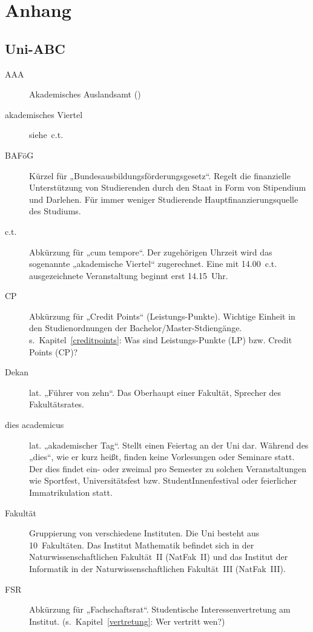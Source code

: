 
\section{Anhang}

\subsection{Uni-ABC}

\begin{description}
\item[AAA] Akademisches Auslandsamt ()
\item[akademisches Viertel] siehe~c.t.
\item[BAFöG] Kürzel für „Bundesausbildungsförderungsgesetz“.
             Regelt die finanzielle Unterstützung von Studierenden durch den Staat in Form von Stipendium und Darlehen.
             Für immer weniger Studierende Hauptfinanzierungsquelle des Studiums.
\item[c.t.] Abkürzung für „cum tempore“.
            Der zugehörigen Uhrzeit wird das sogenannte „akademische Viertel“ zugerechnet.
            Eine mit 14.00~c.t. ausgezeichnete Veranstaltung beginnt erst 14.15~Uhr.
\item[CP] Abkürzung für „Credit Points“ (Leistungs-Punkte). Wichtige Einheit in den Studienordnungen der Bachelor/Master-Stdiengänge.
          s.~Kapitel~\ref{creditpoints}: Was sind Leistungs-Punkte (LP) bzw. Credit Points (CP)?
\item[Dekan] lat. „Führer von zehn“. Das Oberhaupt einer Fakultät, Sprecher des Fakultätsrates.
\item[dies academicus] lat. „akademischer Tag“. Stellt einen Feiertag an der Uni dar.
                       Während des „dies“, wie er kurz heißt, finden keine Vorlesungen oder Seminare statt.
                       Der dies findet ein- oder zweimal pro Semester zu solchen Veranstaltungen wie Sportfest,
                       Universitätsfest bzw. StudentInnenfestival oder feierlicher Immatrikulation statt.
\item[Fakultät] Gruppierung von verschiedene Instituten. Die Uni besteht aus 10~Fakultäten.
                Das Institut Mathematik befindet sich in der Naturwissenschaftlichen Fakultät~II (NatFak~II)
                und das Institut der Informatik in der Naturwissenschaftlichen Fakultät~III (NatFak~III).
\item[FSR] Abkürzung für „Fachschaftsrat“. Studentische Interessenvertretung am Institut.
           (s.~Kapitel~\ref{vertretung}: Wer vertritt wen?)

\end{description}
